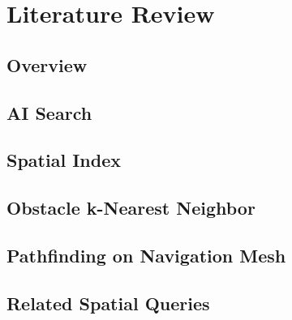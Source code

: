 \chapter{Literature Review}\label{lreview}
\section{Overview}\label{lroverview}
\section{AI Search}\label{lrai}
\section{Spatial Index}\label{lrindex}
\section{Obstacle k-Nearest Neighbor}\label{lrknn}
\section{Pathfinding on Navigation Mesh}\label{lrnav}
\section{Related Spatial Queries}\label{lrquery}
